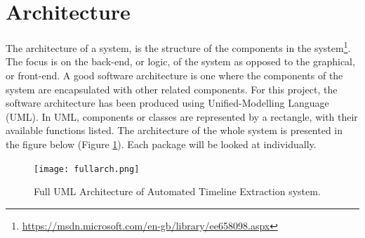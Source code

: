 \section{Architecture}
\par The architecture of a system, is the structure of the components in the system\footnote{\url{https://msdn.microsoft.com/en-gb/library/ee658098.aspx}}. The focus is on the back-end, or logic, of the system as opposed to the graphical, or front-end. A good software architecture is one where the components of the system are encapsulated with other related components. For this project, the software architecture has been produced using Unified-Modelling Language (UML). In UML, components or classes are represented by a rectangle, with their available functions listed. The architecture of the whole system is presented in the figure below (Figure \ref{fig:fullArch}). Each package will be looked at individually.
\begin{figure}[H]
\caption{Full UML Architecture of Automated Timeline Extraction system.}
\label{fig:fullArch}
\texttt{[image: fullarch.png]}
\centering
\end{figure}
